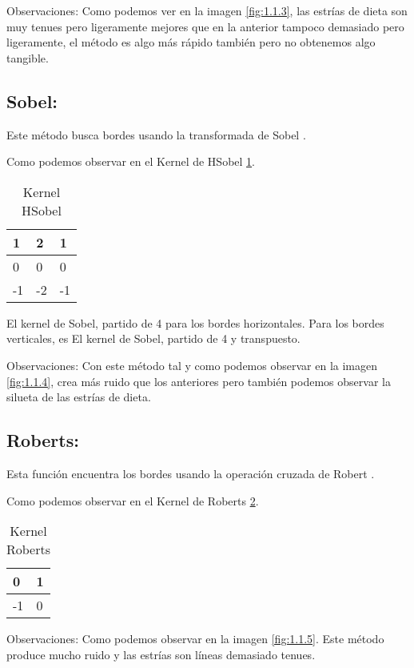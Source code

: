 Observaciones:
Como podemos ver en la imagen \ref{fig:1.1.3}, las estrías de dieta son muy tenues pero ligeramente mejores que en la anterior tampoco demasiado pero ligeramente, el método es algo más rápido también pero no obtenemos algo tangible.




\subsection{Sobel:}
Este método busca bordes usando la transformada de Sobel \cite{wiki:Sobel}.


Como podemos observar en el Kernel de HSobel \ref{F_k4}.
\begin{table}[]
	\centering
	\caption{Kernel HSobel}
	\label{F_k4}
	\begin{tabular}{|l|l|l|}
		\hline
		1  & 2  & 1 \\ \hline
		0  & 0  & 0 \\ \hline
		-1 & -2 & -1 \\ \hline
	\end{tabular}
\end{table}

El kernel de Sobel, partido de 4 para los bordes horizontales.
Para los bordes verticales, es El kernel de Sobel, partido de 4 y transpuesto. 

Observaciones: 
Con este método tal y como podemos observar en la imagen \ref{fig:1.1.4}, crea más ruido que los anteriores pero también podemos observar la silueta de las estrías de dieta.


\subsection{Roberts:}

Esta función encuentra los bordes usando la operación cruzada de Robert \cite{wiki:Roberts}.

Como podemos observar en el Kernel de Roberts \ref{F_k5}.
\begin{table}[]
	\centering
	\caption{Kernel Roberts}
	\label{F_k5}
	\begin{tabular}{|l|l|}
		\hline
		0  & 1 \\ \hline
		-1 & 0 \\ \hline
	\end{tabular}
\end{table}




Observaciones:
Como podemos observar en la imagen \ref{fig:1.1.5}.
Este método produce mucho ruido y las estrías son líneas demasiado tenues.

